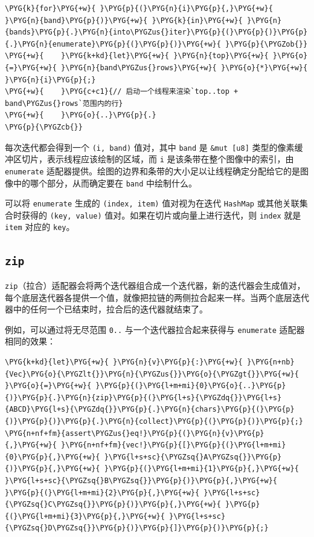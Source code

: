 \begin{Verbatim}[commandchars=\\\{\},breaklines=true,breakanywhere=true,fontsize=\codefont,xleftmargin=17bp]
\PYG{k}{for}\PYG{+w}{ }\PYG{p}{(}\PYG{n}{i}\PYG{p}{,}\PYG{+w}{ }\PYG{n}{band}\PYG{p}{)}\PYG{+w}{ }\PYG{k}{in}\PYG{+w}{ }\PYG{n}{bands}\PYG{p}{.}\PYG{n}{into\PYGZus{}iter}\PYG{p}{(}\PYG{p}{)}\PYG{p}{.}\PYG{n}{enumerate}\PYG{p}{(}\PYG{p}{)}\PYG{+w}{ }\PYG{p}{\PYGZob{}}
\PYG{+w}{    }\PYG{k+kd}{let}\PYG{+w}{ }\PYG{n}{top}\PYG{+w}{ }\PYG{o}{=}\PYG{+w}{ }\PYG{n}{band\PYGZus{}rows}\PYG{+w}{ }\PYG{o}{*}\PYG{+w}{ }\PYG{n}{i}\PYG{p}{;}
\PYG{+w}{    }\PYG{c+c1}{// 启动一个线程来渲染`top..top + band\PYGZus{}rows`范围内的行}
\PYG{+w}{    }\PYG{o}{..}\PYG{p}{.}
\PYG{p}{\PYGZcb{}}
\end{Verbatim}

每次迭代都会得到一个 \texttt{(i, band)} 值对，其中 \texttt{band} 是 \texttt{\&mut [u8]} 类型的像素缓冲区切片，表示线程应该绘制的区域，而 \texttt{i} 是该条带在整个图像中的索引，由 \texttt{enumerate} 适配器提供。绘图的边界和条带的大小足以让线程确定分配给它的是图像中的哪个部分，从而确定要在 \texttt{band} 中绘制什么。

可以将 \texttt{enumerate} 生成的 \texttt{(index, item)} 值对视为在迭代 \texttt{HashMap} 或其他关联集合时获得的 \texttt{(key, value)} 值对。如果在切片或向量上进行迭代，则 \texttt{index} 就是 \texttt{item} 对应的 \texttt{key}。

\subsection{\texttt{zip}}

\texttt{zip}（拉合）适配器会将两个迭代器组合成一个迭代器，新的迭代器会生成值对，每个底层迭代器各提供一个值，就像把拉链的两侧拉合起来一样。当两个底层迭代器中的任何一个已结束时，拉合后的迭代器就结束了。

例如，可以通过将无尽范围 \texttt{0..} 与一个迭代器拉合起来获得与 \texttt{enumerate} 适配器相同的效果：

\begin{Verbatim}[commandchars=\\\{\},breaklines=true,breakanywhere=true,fontsize=\codefont,xleftmargin=17bp]
\PYG{k+kd}{let}\PYG{+w}{ }\PYG{n}{v}\PYG{p}{:}\PYG{+w}{ }\PYG{n+nb}{Vec}\PYG{o}{\PYGZlt{}}\PYG{n}{\PYGZus{}}\PYG{o}{\PYGZgt{}}\PYG{+w}{ }\PYG{o}{=}\PYG{+w}{ }\PYG{p}{(}\PYG{l+m+mi}{0}\PYG{o}{..}\PYG{p}{)}\PYG{p}{.}\PYG{n}{zip}\PYG{p}{(}\PYG{l+s}{\PYGZdq{}}\PYG{l+s}{ABCD}\PYG{l+s}{\PYGZdq{}}\PYG{p}{.}\PYG{n}{chars}\PYG{p}{(}\PYG{p}{)}\PYG{p}{)}\PYG{p}{.}\PYG{n}{collect}\PYG{p}{(}\PYG{p}{)}\PYG{p}{;}
\PYG{n+nf+fm}{assert\PYGZus{}eq!}\PYG{p}{(}\PYG{n}{v}\PYG{p}{,}\PYG{+w}{ }\PYG{n+nf+fm}{vec!}\PYG{p}{[}\PYG{p}{(}\PYG{l+m+mi}{0}\PYG{p}{,}\PYG{+w}{ }\PYG{l+s+sc}{\PYGZsq{}A\PYGZsq{}}\PYG{p}{)}\PYG{p}{,}\PYG{+w}{ }\PYG{p}{(}\PYG{l+m+mi}{1}\PYG{p}{,}\PYG{+w}{ }\PYG{l+s+sc}{\PYGZsq{}B\PYGZsq{}}\PYG{p}{)}\PYG{p}{,}\PYG{+w}{ }\PYG{p}{(}\PYG{l+m+mi}{2}\PYG{p}{,}\PYG{+w}{ }\PYG{l+s+sc}{\PYGZsq{}C\PYGZsq{}}\PYG{p}{)}\PYG{p}{,}\PYG{+w}{ }\PYG{p}{(}\PYG{l+m+mi}{3}\PYG{p}{,}\PYG{+w}{ }\PYG{l+s+sc}{\PYGZsq{}D\PYGZsq{}}\PYG{p}{)}\PYG{p}{]}\PYG{p}{)}\PYG{p}{;}
\end{Verbatim}

